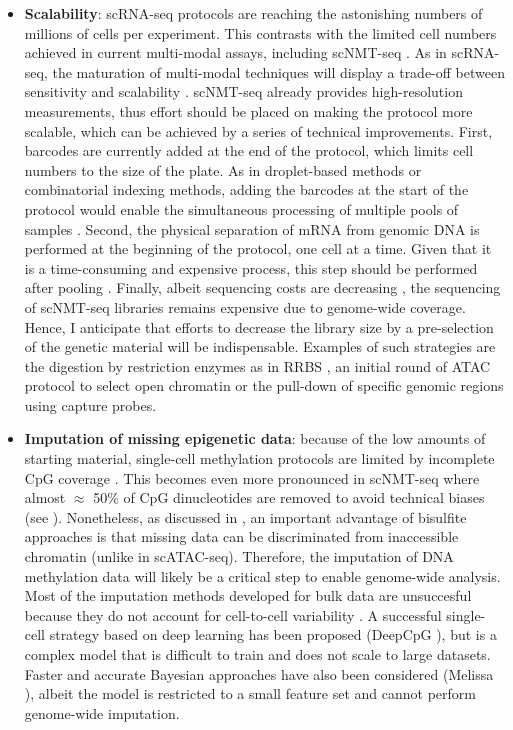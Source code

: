 \begin{itemize}

	\item \textbf{Scalability}: scRNA-seq protocols are reaching the astonishing numbers of millions of cells per experiment. This contrasts with the limited cell numbers achieved in current multi-modal assays, including scNMT-seq \cite{Cao2019,Cao2018,Guo2017}. As in scRNA-seq, the maturation of multi-modal techniques will display a trade-off between sensitivity and scalability \cite{Chappell2018}. scNMT-seq already provides high-resolution measurements, thus effort should be placed on making the protocol more scalable, which can be achieved by a series of technical improvements. First, barcodes are currently added at the end of the protocol, which limits cell numbers to the size of the plate. As in droplet-based methods or combinatorial indexing methods, adding the barcodes at the start of the protocol would enable the simultaneous processing of multiple pools of samples \cite{Dey2015,Mulqueen2018}. Second, the physical separation of mRNA from genomic DNA is performed at the beginning of the protocol, one cell at a time. Given that it is a time-consuming and expensive process, this step should be performed after pooling \cite{Dey2015}. Finally, albeit sequencing costs are decreasing \cite{Svensson2018}, the sequencing of scNMT-seq libraries remains expensive due to genome-wide coverage. Hence, I anticipate that efforts to decrease the library size by a pre-selection of the genetic material will be indispensable. Examples of such strategies are the digestion by restriction enzymes as in RRBS \cite{Guo2013}, an initial round of ATAC protocol to select open chromatin \cite{Spektor2018} or the pull-down of specific genomic regions using capture probes.

	\item \textbf{Imputation of missing epigenetic data}: because of the low amounts of starting material, single-cell methylation protocols are limited by incomplete CpG coverage \cite{Angermueller2017}. This becomes even more pronounced in scNMT-seq where almost $\approx$ 50\% of CpG dinucleotides are removed to avoid technical biases (see ). Nonetheless, as discussed in , an important advantage of bisulfite approaches is that missing data can be discriminated from inaccessible chromatin (unlike in scATAC-seq). Therefore, the imputation of DNA methylation data will likely be a critical step to enable genome-wide analysis. Most of the imputation methods developed for bulk data are unsuccesful because they do not account for cell-to-cell variability \cite{Angermueller2017}. A successful single-cell strategy based on deep learning has been proposed (DeepCpG \cite{Angermueller2017}), but is a complex model that is difficult to train and does not scale to large datasets. Faster and accurate Bayesian approaches have also been considered (Melissa \cite{Kapourani2018b}), albeit the model is restricted to a small feature set and cannot perform genome-wide imputation.


\end{itemize}
